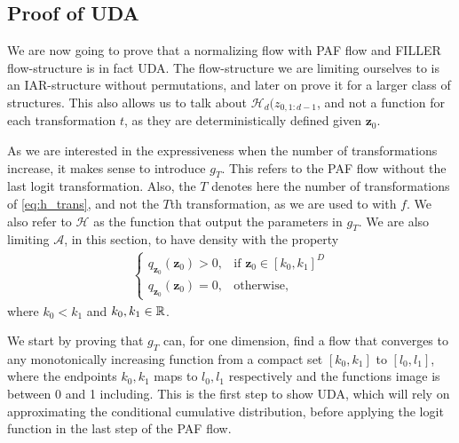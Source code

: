 \subsection{Proof of UDA}
We are now going to prove that a normalizing flow with PAF flow and FILLER flow-structure is in fact UDA. The flow-structure we are 
limiting ourselves to is an IAR-structure without permutations, and later on prove it for a larger class of structures. This also
allows us to talk about \(\mathcal{H}_d(z_{0,1:d-1}\), and not a function for each transformation \(t\), as they are deterministically
defined given \(\bm z_{0}\).

As we are interested in the
expressiveness when the number of transformations increase, it makes sense to introduce \(g_{T}\). This refers to the PAF flow without
the last logit transformation. Also, the \(T\) denotes here the number of transformations of \cref{eq:h_trans}, and not the \(T\)th transformation, 
as we are used to with \(f\).  
We also refer to \(\mathcal{H}\) as the function that output the parameters in \(g_{T}\). We are also limiting \(\mathcal{A}\), in this section,
to have density with the property
\begin{align*}
    \begin{cases}
        q_{\bm z_0}(\bm z_0) > 0, & \text{if \(\bm z_0 \in [k_0,k_1]^D\)}\\
        q_{\bm z_0}(\bm z_0) = 0, & \text{otherwise},
    \end{cases}
\end{align*}
where \(k_0 < k_1\) and \(k_0, k_1 \in \mathbb{R}\).

We start by proving that \(g_T\) can, for one dimension, find a flow that converges to any monotonically increasing function from a 
compact set \([k_0, k_1]\) to \([l_0,l_1]\), where the endpoints \(k_0,k_1\) maps to \(l_0,l_1\) respectively and the functions image
is between 0 and 1 including. 
This is the first step to show UDA, which will rely on approximating the conditional cumulative
distribution, before applying the logit function in the last step of the PAF flow.

